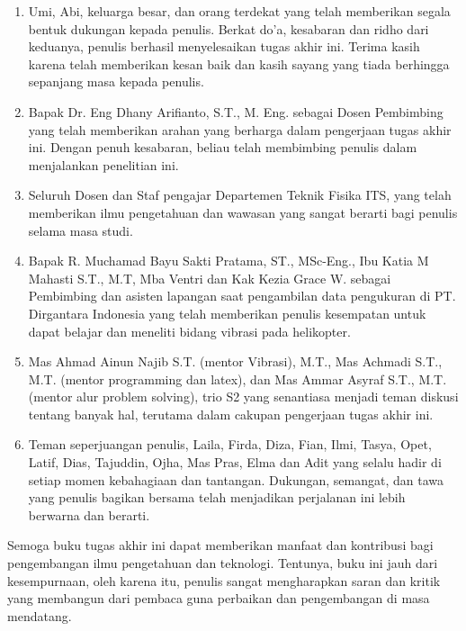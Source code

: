 \begin{enumerate}[nolistsep]
	
	\item Umi, Abi, keluarga besar, dan orang terdekat yang telah memberikan segala bentuk dukungan kepada penulis. Berkat do'a, kesabaran dan ridho dari keduanya, penulis berhasil menyelesaikan tugas akhir ini. Terima kasih karena telah memberikan kesan baik dan kasih sayang yang tiada berhingga sepanjang masa kepada penulis. 
	
	\item Bapak Dr. Eng Dhany Arifianto, S.T., M. Eng. sebagai Dosen Pembimbing yang telah memberikan arahan yang berharga dalam pengerjaan tugas akhir ini. Dengan penuh kesabaran, beliau telah membimbing penulis dalam menjalankan penelitian ini. 
	
	\item Seluruh Dosen dan Staf pengajar Departemen Teknik Fisika ITS, yang telah memberikan ilmu pengetahuan dan wawasan yang sangat berarti bagi penulis selama masa studi. 
	
	\item Bapak R. Muchamad Bayu Sakti Pratama, ST., MSc-Eng., Ibu Katia M Mahasti S.T., M.T, Mba Ventri dan Kak Kezia Grace W. sebagai Pembimbing dan asisten lapangan saat pengambilan data pengukuran di PT. Dirgantara Indonesia yang telah memberikan penulis kesempatan untuk dapat belajar dan meneliti bidang vibrasi pada helikopter.
	
	\item Mas Ahmad Ainun Najib S.T. (mentor Vibrasi), M.T., Mas Achmadi S.T., M.T. (mentor programming dan latex), dan Mas Ammar Asyraf S.T., M.T. (mentor alur problem solving), trio S2 yang senantiasa menjadi teman diskusi tentang banyak hal, terutama dalam cakupan pengerjaan tugas akhir ini.
	
	\item Teman seperjuangan penulis, Laila, Firda, Diza, Fian, Ilmi, Tasya, Opet, Latif, Dias, Tajuddin, Ojha, Mas Pras, Elma dan Adit yang selalu hadir di setiap momen kebahagiaan dan tantangan. Dukungan, semangat, dan tawa yang penulis bagikan bersama telah menjadikan perjalanan ini lebih berwarna dan berarti.
		
\end{enumerate} 

Semoga buku tugas akhir ini dapat memberikan manfaat dan kontribusi bagi pengembangan ilmu pengetahuan dan teknologi. Tentunya, buku ini jauh dari kesempurnaan, oleh karena itu, penulis sangat mengharapkan saran dan kritik yang membangun dari pembaca guna perbaikan dan pengembangan di masa mendatang.

